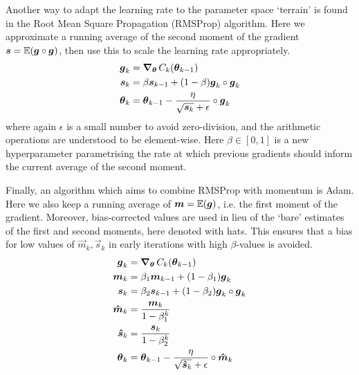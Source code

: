         Another way to adapt the learning rate to the parameter space `terrain' is found in the Root Mean Square Propagation (RMSProp) algorithm. Here we approximate a running average of the second moment of the gradient $\boldsymbol{s} = \operatorname{\mathbb{E}}(\boldsymbol{g} \circ \boldsymbol{g})$, then use this to scale the learning rate appropriately.
        \begin{align*}
            \boldsymbol{g}_k &= \operatorname{\operatorname{\boldsymbol{\nabla}}_{\boldsymbol{\theta}}} C_k(\boldsymbol{\theta}_{k-1}) \\
            \boldsymbol{s}_k &= \beta \boldsymbol{s}_{k-1} + (1-\beta) \boldsymbol{g}_k \circ \boldsymbol{g}_k \\
            \boldsymbol{\theta}_k &= \boldsymbol{\theta}_{k-1} - \frac{\eta}{\sqrt{\boldsymbol{s}_k}+\epsilon} \circ \boldsymbol{g}_k
        \end{align*}
        where again $\epsilon$ is a small number to avoid zero-division, and the arithmetic operations are understood to be element-wise. Here $\beta \in [0,1]$ is a new hyperparameter parametrising the rate at which previous gradients should inform the current average of the second moment.

        Finally, an algorithm which aims to combine RMSProp with momentum is Adam. Here we also keep a running average of $\boldsymbol{m} = \operatorname{\mathbb{E}}(\boldsymbol{g})$, i.e. the first moment of the gradient. Moreover, bias-corrected values are used in lieu of the `bare' estimates of the first and second moments, here denoted with hats. This ensures that a bias for low values of $\vec{m}_k, \vec{s}_k$ in early iterations with high $\beta$-values is avoided.
        \begin{align*}
            \boldsymbol{g}_k &= \operatorname{\operatorname{\boldsymbol{\nabla}}_{\boldsymbol{\theta}}} C_k(\boldsymbol{\theta}_{k-1}) \\
            \boldsymbol{m}_k &= \beta_1 \boldsymbol{m}_{k-1} + (1-\beta_1) \boldsymbol{g}_k \\
            \boldsymbol{s}_k &= \beta_2 \boldsymbol{s}_{k-1} + (1-\beta_2) \boldsymbol{g}_k \circ \boldsymbol{g}_k \\
            \boldsymbol{\hat{m}}_k &= \frac{\boldsymbol{m}_k}{1-\beta_1^k} \\
            \boldsymbol{\hat{s}}_k &= \frac{\boldsymbol{s}_k}{1-\beta_2^k} \\
            \boldsymbol{\theta}_k &= \boldsymbol{\theta}_{k-1} - \frac{\eta}{\sqrt{\boldsymbol{\hat{s}}_k}+\epsilon} \circ \boldsymbol{\hat{m}}_k
        \end{align*}



